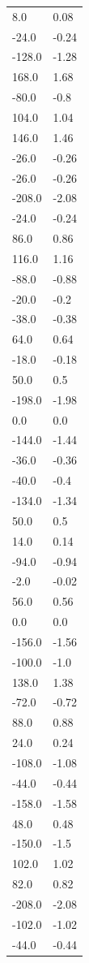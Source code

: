 \begin{longtable}{ll}
8.0 & 0.08 \\
-24.0 & -0.24 \\
-128.0 & -1.28 \\
168.0 & 1.68 \\
-80.0 & -0.8 \\
104.0 & 1.04 \\
146.0 & 1.46 \\
-26.0 & -0.26 \\
-26.0 & -0.26 \\
-208.0 & -2.08 \\
-24.0 & -0.24 \\
86.0 & 0.86 \\
116.0 & 1.16 \\
-88.0 & -0.88 \\
-20.0 & -0.2 \\
-38.0 & -0.38 \\
64.0 & 0.64 \\
-18.0 & -0.18 \\
50.0 & 0.5 \\
-198.0 & -1.98 \\
0.0 & 0.0 \\
-144.0 & -1.44 \\
-36.0 & -0.36 \\
-40.0 & -0.4 \\
-134.0 & -1.34 \\
50.0 & 0.5 \\
14.0 & 0.14 \\
-94.0 & -0.94 \\
-2.0 & -0.02 \\
56.0 & 0.56 \\
0.0 & 0.0 \\
-156.0 & -1.56 \\
-100.0 & -1.0 \\
138.0 & 1.38 \\
-72.0 & -0.72 \\
88.0 & 0.88 \\
24.0 & 0.24 \\
-108.0 & -1.08 \\
-44.0 & -0.44 \\
-158.0 & -1.58 \\
48.0 & 0.48 \\
-150.0 & -1.5 \\
102.0 & 1.02 \\
82.0 & 0.82 \\
-208.0 & -2.08 \\
-102.0 & -1.02 \\
-44.0 & -0.44 \\

\end{longtable}

